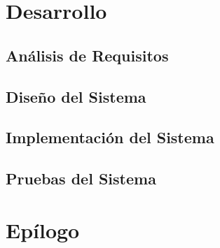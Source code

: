 \documentclass[a4paper,11pt]{book}
\begin{document}
\part{Desarrollo}


\chapter{Análisis de Requisitos}


\chapter{Diseño del Sistema}


\chapter{Implementación del Sistema}


\chapter{Pruebas del Sistema}


\part{Epílogo}
\end{document}

